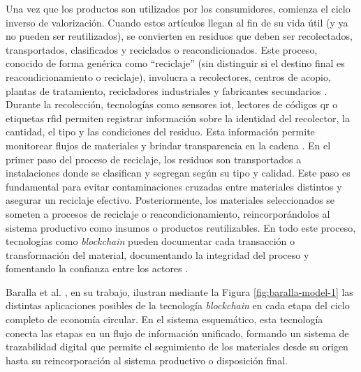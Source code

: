 Una vez que los productos son utilizados por los consumidores, comienza el ciclo inverso de valorización. Cuando estos artículos llegan al fin de su vida útil (y ya no pueden ser reutilizados), se convierten en residuos que deben ser recolectados, transportados, clasificados y reciclados o reacondicionados. Este proceso, conocido de forma genérica como ``reciclaje'' (sin distinguir si el destino final es reacondicionamiento o reciclaje), involucra a recolectores, centros de acopio, plantas de tratamiento, recicladores industriales y fabricantes secundarios \cite{cepal2021economia}. Durante la recolección, tecnologías como sensores \gls{iot}, lectores de códigos \gls{qr} o etiquetas \gls{rfid} permiten registrar información sobre la identidad del recolector, la cantidad, el tipo y las condiciones del residuo. Esta información permite monitorear flujos de materiales y brindar transparencia en la cadena \cite{wong2024enhancing}. En el primer paso del proceso de reciclaje, los residuos son transportados a instalaciones donde se clasifican y segregan según su tipo y calidad. Este paso es fundamental para evitar contaminaciones cruzadas entre materiales distintos y asegurar un reciclaje efectivo. Posteriormente, los materiales seleccionados se someten a procesos de reciclaje o reacondicionamiento, reincorporándolos al sistema productivo como insumos o productos reutilizables. En todo este proceso, tecnologías como \textit{blockchain} pueden documentar cada transacción o transformación del material, documentando la integridad del proceso y fomentando la confianza entre los actores \cite{wong2024enhancing}.

Baralla et al. \cite{baralla2023waste}, en su trabajo, ilustran mediante la Figura \ref{fig:baralla-model-1} las distintas aplicaciones posibles de la tecnología \textit{blockchain} en cada etapa del ciclo completo de economía circular. En el sistema esquemático, esta tecnología conecta las etapas en un flujo de información unificado, formando un sistema de trazabilidad digital que permite el seguimiento de los materiales desde su origen hasta su reincorporación al sistema productivo o disposición final.

